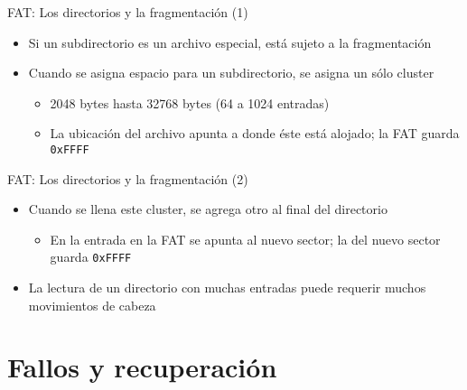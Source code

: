 \documentclass[presentation]{beamer}
\newcommand{\rarrow}{$\rightarrow$\hskip 0.5em}
\begin{document}
\begin{frame}[label={sec:orgf768b5d},fragile]{FAT: Los directorios y la fragmentación (1)}
 \begin{itemize}
\item Si un subdirectorio es un archivo especial, está sujeto a la fragmentación
\item Cuando se asigna espacio para un subdirectorio, se asigna un sólo
cluster
\begin{itemize}
\item 2048 bytes hasta 32768 bytes (64 a 1024 entradas)
\item La ubicación del archivo apunta a donde éste está alojado; la FAT
guarda \texttt{0xFFFF}
\end{itemize}
\end{itemize}
\end{frame}

\begin{frame}[label={sec:org41a2544},fragile]{FAT: Los directorios y la fragmentación (2)}
 \begin{itemize}
\item Cuando se llena este cluster, se agrega otro al final del directorio
\begin{itemize}
\item En la entrada en la FAT se apunta al nuevo sector; la del nuevo
sector guarda \texttt{0xFFFF}
\end{itemize}
\item La lectura de un directorio con muchas entradas puede requerir
muchos movimientos de cabeza
\end{itemize}
\end{frame}

\section{Fallos y recuperación}
\label{sec:org33cbb82}
\end{document}
